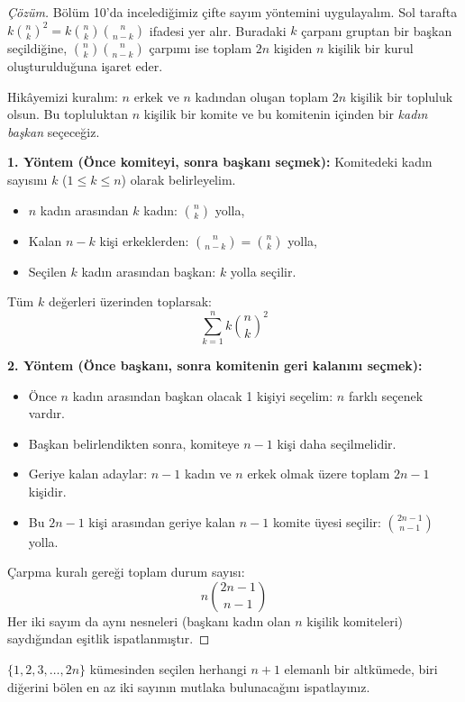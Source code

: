 \begin{proof}[Çözüm]
Bölüm 10'da incelediğimiz çifte sayım yöntemini uygulayalım. Sol tarafta $k \binom{n}{k}^2 = k \binom{n}{k}\binom{n}{n-k}$ ifadesi yer alır. Buradaki $k$ çarpanı gruptan bir başkan seçildiğine, $\binom{n}{k}\binom{n}{n-k}$ çarpımı ise toplam $2n$ kişiden $n$ kişilik bir kurul oluşturulduğuna işaret eder.

Hikâyemizi kuralım: $n$ erkek ve $n$ kadından oluşan toplam $2n$ kişilik bir topluluk olsun. Bu topluluktan $n$ kişilik bir komite ve bu komitenin içinden bir \emph{kadın başkan} seçeceğiz.

\textbf{1. Yöntem (Önce komiteyi, sonra başkanı seçmek):}
Komitedeki kadın sayısını $k$ ($1 \le k \le n$) olarak belirleyelim.
\begin{itemize}
    \item $n$ kadın arasından $k$ kadın: $\binom{n}{k}$ yolla,
    \item Kalan $n - k$ kişi erkeklerden: $\binom{n}{n-k} = \binom{n}{k}$ yolla,
    \item Seçilen $k$ kadın arasından başkan: $k$ yolla seçilir.
\end{itemize}
Tüm $k$ değerleri üzerinden toplarsak:
\[
\sum_{k=1}^n k \binom{n}{k}^2
\]

\textbf{2. Yöntem (Önce başkanı, sonra komitenin geri kalanını seçmek):}
\begin{itemize}
    \item Önce $n$ kadın arasından başkan olacak 1 kişiyi seçelim: $n$ farklı seçenek vardır.
    \item Başkan belirlendikten sonra, komiteye $n-1$ kişi daha seçilmelidir.
    \item Geriye kalan adaylar: $n-1$ kadın ve $n$ erkek olmak üzere toplam $2n - 1$ kişidir.
    \item Bu $2n - 1$ kişi arasından geriye kalan $n-1$ komite üyesi seçilir: $\binom{2n-1}{n-1}$ yolla.
\end{itemize}
Çarpma kuralı gereği toplam durum sayısı:
\[
n \binom{2n-1}{n-1}
\]
Her iki sayım da aynı nesneleri (başkanı kadın olan $n$ kişilik komiteleri) saydığından eşitlik ispatlanmıştır.
\end{proof}

\begin{example}
$\{1, 2, 3, \dots, 2n\}$ kümesinden seçilen herhangi $n+1$ elemanlı bir altkümede, biri diğerini bölen en az iki sayının mutlaka bulunacağını ispatlayınız.
\end{example}

